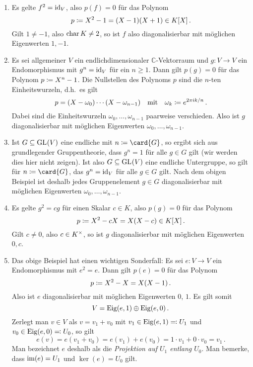 \begin{example}
  \label{example: diagonalizable via polynomials}
  \leavevmode
  \begin{enumerate}
    \item
      Es gelte $f^2 = \operatorname{id}_V$, also $p(f) = 0$ für das Polynom
      \[
                  p
        \coloneqq  X^2 - 1
        =         (X - 1)(X + 1)
        \in       K[X] \,.
      \]
      Gilt $1 \neq -1$, also $\operatorname{char}{K} \neq 2$, so ist $f$ also diagonalisierbar mit möglichen Eigenwerten $1, -1$.
    \item
      Es sei allgemeiner $V$ ein endlichdimensionaler $\mathbb{C}$-Vektorraum und $g \colon V \to V$ ein Endomorphismus mit $g^n = \operatorname{id}_V$ für ein $n \geq 1$.
      Dann gilt $p(g) = 0$ für das Polynom $p \coloneqq X^n - 1$.
      Die Nullstellen des Polynoms $p$ sind die $n$-ten Einheitswurzeln, d.h.\ es gilt
      \[
        p = (X - \omega_0) \dotsm (X - \omega_{n-1})
        \quad\text{mit}\quad
        \omega_k \coloneqq e^{2 \pi i k / n} \,.
      \]
      Dabei sind die Einheitswurzeln $\omega_0, \dotsc, \omega_{n-1}$ paarweise verschieden.
      Also ist $g$ diagonalisierbar mit möglichen Eigenwerten $\omega_0, \dotsc, \omega_{n-1}$.
    \item
      Ist $G \subseteq \operatorname{GL}_{}(V)$ eine endliche mit $n \defined \card{G}$, so ergibt sich aus grundlegender Gruppentheorie, dass $g^n = 1$ für alle $g \in G$ gilt (wir werden dies hier nicht zeigen).
      Ist also $G \subseteq \operatorname{GL}_{}(V)$ eine endliche Untergruppe, so gilt für $n \defined \card{G}$, das $g^n = \operatorname{id}_V$ für alle $g \in G$ gilt.
      Nach dem obigen Beispiel ist deshalb jedes Gruppenelement $g \in G$ diagonalisierbar mit möglichen Eigenwerten $\omega_0, \dotsc, \omega_{n-1}$.
    \item
      Es gelte $g^2 = cg$ für einen Skalar $c \in K$, also $p(g) = 0$ für das Polynom
      \[
                  p
        \coloneqq  X^2 - cX
        =         X(X-c)
        \in       K[X] \,.
      \]
      Gilt $c \neq 0$, also $c \in K^\times$, so ist $g$ diagonalisierbar mit möglichen Eigenwerten $0, c$.
    \item
      Das obige Beispiel hat einen wichtigen Sonderfall:
      Es sei $e \colon V \to V$ ein Endomorphismus mit $e^2 = e$.
      Dann gilt $p(e) = 0$ für das Polynom
      \[
                  p
        \coloneqq  X^2 - X
        =         X(X-1) \,.
      \]
      Also ist $e$ diagonalisierbar mit möglichen Eigenwerten $0$, $1$.
      Es gilt somit
      \[
        V = \operatorname{Eig}(e, 1) \oplus \operatorname{Eig}(e, 0) \,.
      \]
      Zerlegt man $v \in V$ als $v = v_1 + v_0$ mit $v_1 \in \operatorname{Eig}(e, 1) \eqqcolon U_1$ und $v_0 \in \operatorname{Eig}(e, 0) \eqqcolon U_0$, so gilt
      \[
          e(v)
        = e(v_1 + v_0)
        = e(v_1) + e(v_0)
        = 1 \cdot v_1 + 0 \cdot v_0
        = v_1 \,.
      \]
      Man bezeichnet $e$ deshalb als die \emph{Projektion auf $U_1$ entlang $U_0$}.
      Man bemerke, dass $\operatorname{im}(e) = U_1$ und $\ker(e) = U_0$ gilt.
  \end{enumerate}
\end{example}

